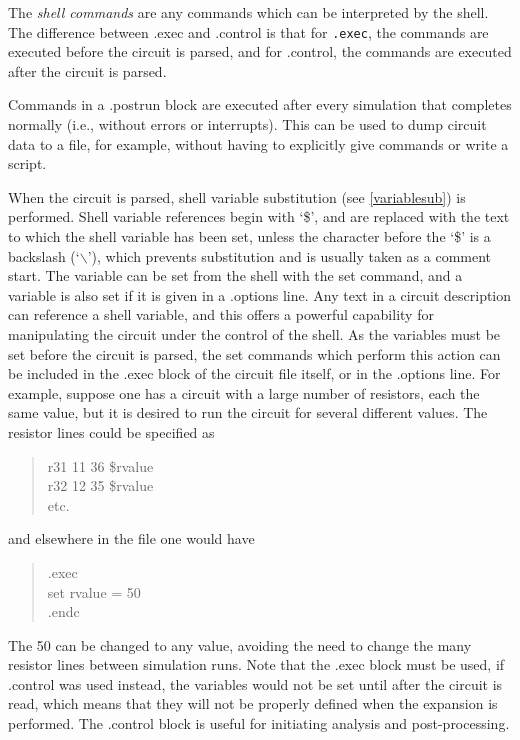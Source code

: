 
The {\it shell commands} are any commands which can be interpreted by
the {\WRspice} shell.  The difference between {\vt .exec} and {\vt
.control} is that for {\tt .exec}, the commands are executed before
the circuit is parsed, and for {\vt .control}, the commands are
executed after the circuit is parsed.

Commands in a {\vt .postrun} block are executed after every simulation
that completes normally (i.e., without errors or interrupts).  This
can be used to dump circuit data to a file, for example, without
having to explicitly give commands or write a script.

When the circuit is parsed, shell variable substitution (see
\ref{variablesub}) is performed.  Shell variable references begin with
`{\vt \$}', and are replaced with the text to which the shell variable
has been set, unless the character before the `{\vt \$}' is a
backslash (`$\backslash$'), which prevents substitution and is usually
taken as a comment start.  The variable can be set from the shell with
the {\cb set} command, and a variable is also set if it is given in a
{\vt .options} line.  Any text in a circuit description can reference
a shell variable, and this offers a powerful capability for
manipulating the circuit under the control of the shell.  As the
variables must be set before the circuit is parsed, the {\cb set}
commands which perform this action can be included in the {\vt .exec}
block of the circuit file itself, or in the {\vt .options} line.  For
example, suppose one has a circuit with a large number of resistors,
each the same value, but it is desired to run the circuit for several
different values.  The resistor lines could be specified as
\begin{quote}\vt
r31 11 36 \$rvalue\\
r32 12 35 \$rvalue\\
{\rm etc.}
\end{quote}
and elsewhere in the file one would have
\begin{quote}\vt
.exec\\
set rvalue = 50\\
.endc
\end{quote}
The 50 can be changed to any value, avoiding the need to change the
many resistor lines between simulation runs.  Note that the {\vt .exec}
block must be used, if {\vt .control} was used instead, the variables
would not be set until after the circuit is read, which means that they
will not be properly defined when the expansion is performed.
The {\vt .control} block is useful for initiating analysis and
post-processing.

